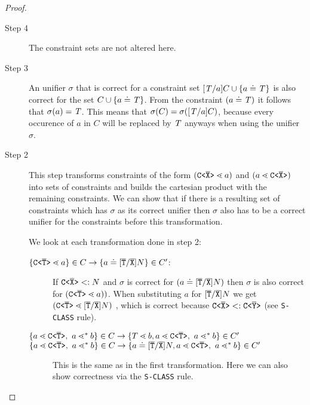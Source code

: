 \begin{proof}
\begin{description}

\item[Step 4]
The constraint sets are not altered here.

\item[Step 3]
An unifier $\sigma$ that is correct for a constraint set
$[\mathit{T}/a]C \cup \{ a \doteq \mathit{T} \}$ is also correct for
the set $C \cup \{ a \doteq \mathit{T} \}$.
From the constraint $(a \doteq \mathit{T})$ it follows that $\sigma(a) = \mathit{T}$.
This means that $\sigma(C) = \sigma([\mathit{T}/a]C)$,
because every occurence of $a$ in $C$ will be replaced by $\mathit{T}$ anyways when using the unifier $\sigma$.

\item[Step 2]
This step transforms constraints of the form $(\mathtt{C \texttt{<} \overline{\tt X} \texttt{>} } \lessdot a)$ and $(a \lessdot \mathtt{C \texttt{<} \overline{\tt X} \texttt{>} })$
into sets of constraints and builds the cartesian product with the remaining constraints.
We can show that if there is a resulting set of constraints which has $\sigma$ as its correct unifier
then $\sigma$ also has to be a correct unifier for the constraints before this transformation.

We look at each transformation done in step 2:
\begin{description}
\item[$\{ \mathtt{C \texttt{<} \overline{\tt T} \texttt{>} } \lessdot a \} \in C \to \{ a \doteq [\overline{\tt T}/\overline{\tt X}]N \} \in C'$:]
If $\mathtt{C \texttt{<} \overline{\tt X} \texttt{>} } <: N$ and $\sigma$ is correct for $(a \doteq [\overline{\tt T}/\overline{\tt X}]N)$
then $\sigma$ is also correct for $(\mathtt{C \texttt{<} \overline{\tt T} \texttt{>} } \lessdot a))$.
When substituting $a$ for $[\overline{\tt T}/\overline{\tt X}]N$ we get 
$(\mathtt{C \texttt{<} \overline{\tt T} \texttt{>} } \lessdot [\overline{\tt T}/\overline{\tt X}]N)$
, which is correct because $\mathtt{C \texttt{<} \overline{\tt X} \texttt{>} } <: \mathtt{C \texttt{<} \overline{\tt Y} \texttt{>} }$
(see \texttt{S-CLASS} rule).
\item[$\{ a \lessdot \mathtt{C \texttt{<} \overline{T} \texttt{>} },\ a \lessdot^* b \} \in C \to \{ T \lessdot b, a \lessdot \mathtt{C \texttt{<} \overline{T} \texttt{>} },\ a \lessdot^* b \} \in C'$]
\item[$\{ a \lessdot \mathtt{C \texttt{<} \overline{T} \texttt{>} },\ a \lessdot^* b \} \in C \to \{ a \doteq [\overline{\tt T}/\overline{\tt X}]N, a \lessdot \mathtt{C \texttt{<} \overline{T} \texttt{>} },\ a \lessdot^* b \} \in C'$]
This is the same as in the first transformation.
Here we can also show correctness via the \texttt{S-CLASS} rule.

\end{description}


\end{description}
\end{proof}
